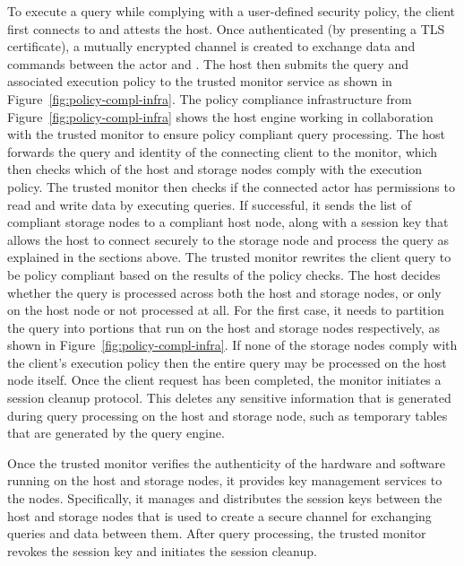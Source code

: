  To execute a query while complying with a user-defined security policy, the client first connects to and attests the host. Once authenticated (by presenting a TLS certificate), a mutually encrypted channel is created to exchange data and commands between the actor and \project{}. The host then submits the query and associated execution policy to the trusted monitor service as shown in Figure~\ref{fig:policy-compl-infra}. The policy compliance infrastructure from Figure~\ref{fig:policy-compl-infra} shows the host engine working in collaboration with the trusted monitor to ensure policy compliant query processing. The host forwards the query and identity of the connecting client to the monitor, which then checks which of the host and storage nodes comply with the execution policy. The trusted monitor then checks if the connected actor has permissions to read and write data by executing queries. If successful, it sends the list of compliant storage nodes to a compliant host node, along with a session key that allows the host to connect securely to the storage node and process the query as explained in the sections above. The trusted monitor rewrites the client query to be policy compliant based on the results of the policy checks. The host decides whether the query is processed across both the host and storage nodes, or only on the host node or not processed at all. For the first case, it needs to partition the query into portions that run on the host and storage nodes respectively, as shown in Figure~\ref{fig:policy-compl-infra}. If none of the storage nodes comply with the client's execution policy then the entire query may be processed on the host node itself. Once the client request has been completed, the monitor initiates a session cleanup protocol. This deletes any sensitive information that is generated during query processing on the host and storage node, such as temporary tables that are generated by the query engine.



 Once the trusted monitor verifies the authenticity of the hardware and software running on the host and storage nodes, it provides key management services to the nodes. Specifically, it manages and distributes the session keys between the host and storage nodes that is used to create a secure channel for exchanging queries and data between them. After query processing, the trusted monitor revokes the session key and initiates the session cleanup.

